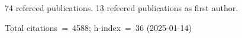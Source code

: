 74 refereed publications. 13 refeered publications as first author.

Total citations~=~4588; h-index~=~36 (2025-01-14)